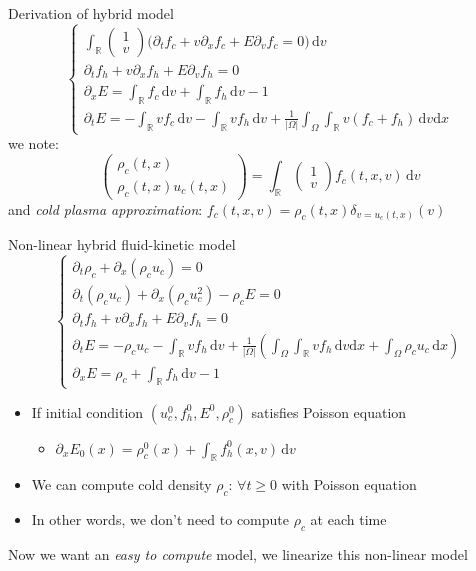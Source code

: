 \documentclass{beamer}
\begin{document}
\begin{frame}{Derivation of hybrid model}
  $$
    \begin{cases}
      \int_\mathbb{R} \begin{pmatrix}1\\v\end{pmatrix} \Big( \partial_t f_c + v\partial_xf_c + E\partial_v f_c = 0 \Big)\,\mathrm{d}v \\
      \partial_t f_h + v\partial_xf_h + E\partial_vf_h = 0 \\
      \partial_x E = \int_\mathbb{R}f_c\,\mathrm{d}v + \int_\mathbb{R}f_h\,\mathrm{d}v - 1 \\
      \partial_t E = - \int_\mathbb{R}vf_c\,\mathrm{d}v - \int_\mathbb{R}vf_h\,\mathrm{d}v + \frac{1}{|\Omega|}\int_\Omega\int_\mathbb{R} v(f_c+f_h)\,\mathrm{d}v\mathrm{d}x
    \end{cases}
  $$
  we note: $$
    \begin{pmatrix}
      \rho_c(t,x)\\ \rho_c(t,x)u_c(t,x)
    \end{pmatrix} = \int_\mathbb{R}\begin{pmatrix}1\\v\end{pmatrix}f_c(t,x,v)\,\mathrm{d}v
  $$
  and \emph{cold plasma approximation}: $f_c(t,x,v) = \rho_c(t,x)\delta_{v=u_c(t,x)}(v)$
\end{frame}
\begin{frame}{Non-linear hybrid fluid-kinetic model}
  $$
    \begin{cases}
      \partial_t \rho_c + \partial_x(\rho_cu_c) = 0\\
      \partial_t(\rho_cu_c) + \partial_x(\rho_cu_c^2)-\rho_cE = 0\\
      \partial_tf_h + v\partial_xf_h + E\partial_vf_h = 0\\
      \partial_tE = -\rho_cu_c - \int_\mathbb{R}vf_h\,\mathrm{d}v + \frac{1}{|\Omega|}\left(\int_\Omega\int_\mathbb{R}vf_h\,\mathrm{d}v\mathrm{d}x + \int_\Omega\rho_cu_c\,\mathrm{d}x \right)\\
      \partial_xE = \rho_c + \int_\mathbb{R}f_h\,\mathrm{d}v - 1
    \end{cases}
  $$
  \begin{itemize}
    \item If initial condition $(u_c^0,f_h^0,E^0,\rho_c^0)$ satisfies Poisson equation \begin{itemize}
      \item $\partial_x E_0(x) = \rho_c^0(x) + \int_\mathbb{R}f_h^0(x,v)\,\mathrm{d}v$
    \end{itemize}
    \item We can compute cold density $\rho_c$: $\forall t\geq0$ with Poisson equation
    \item In other words, we don't need to compute $\rho_c$ at each time
  \end{itemize}
  Now we want an \emph{easy to compute} model, we linearize this non-linear model
\end{frame}
\end{document}
